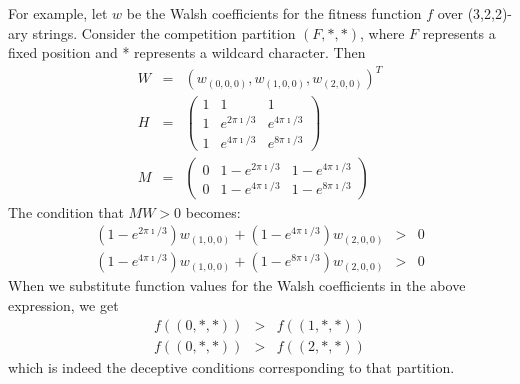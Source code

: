 For example, let $w$ be the Walsh coefficients for the fitness function $f$
over (3,2,2)-ary strings.  Consider the competition partition $(F,*,*)$, where
$F$ represents a fixed position and * represents a wildcard character.  Then
\begin{eqnarray}
W&=&(w_{(0,0,0)},w_{(1,0,0)},w_{(2,0,0)})^T \nonumber\\
H&=&\left(\begin{array}{ccc}
	1&1&1\\
	1&e^{2 \pi \imath/3}&e^{4 \pi \imath/3}\\
	1&e^{4 \pi \imath/3}&e^{8 \pi \imath/3}
	\end{array}
	\right) \nonumber\\
M&=&\left(\begin{array}{ccc}
	0&1-e^{2 \pi \imath/3}&1-e^{4 \pi \imath/3} \\
	0&1-e^{4 \pi \imath/3}&1-e^{8 \pi \imath/3}
	\end{array}
	\right)
\end{eqnarray}
The condition that $MW>0$ becomes:
\begin{eqnarray}
(1-e^{2\pi \imath/3})w_{(1,0,0)}+(1-e^{4\pi\imath/3})w_{(2,0,0)} &>&0\nonumber\\
(1-e^{4\pi \imath/3})w_{(1,0,0)}+(1-e^{8\pi\imath/3})w_{(2,0,0)} &>&0
\end{eqnarray}
When we substitute function values for the Walsh coefficients in the above
expression, we get
\begin{eqnarray}
f((0,*,*)) &>& f((1,*,*)) \nonumber\\
f((0,*,*)) &>& f((2,*,*))
\end{eqnarray}
which is indeed the deceptive conditions corresponding to that partition.

